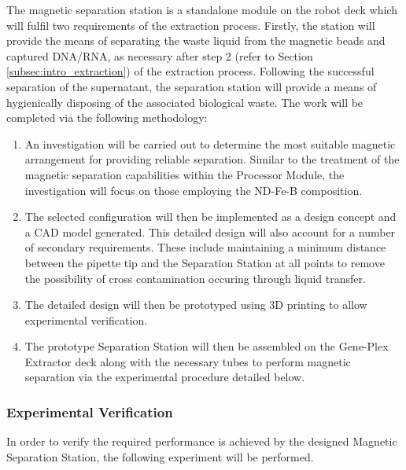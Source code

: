 The magnetic separation station is a standalone module on the robot deck which will fulfil two requirements of the extraction process. Firstly, the station will provide the means of separating the waste liquid from the magnetic beads and captured DNA/RNA, as necessary after step 2 (refer to Section \ref{subsec:intro_extraction}) of the extraction process. Following the successful separation of the supernatant, the separation station will provide a means of hygienically disposing of the associated biological waste. The work will be completed via the following methodology:

\begin{enumerate}
	\item An investigation will be carried out to determine the most suitable magnetic arrangement for providing reliable separation. Similar to the treatment of the magnetic separation capabilities within the Processor Module, the investigation will focus on those employing the ND-Fe-B composition.
	\item The selected configuration will then be implemented as a design concept and a CAD model generated. This detailed design will also account for a number of secondary requirements. These include maintaining a minimum distance between the pipette tip and the Separation Station at all points to remove the possibility of cross contamination occuring through liquid transfer.
	\item The detailed design will then be prototyped using 3D printing to allow experimental verification.
	\item The prototype Separation Station will then be assembled on the Gene-Plex Extractor deck along with the necessary tubes to perform magnetic separation via the experimental procedure detailed below.
\end{enumerate}

\subsubsection{Experimental Verification}

In order to verify the required performance is achieved by the designed Magnetic Separation Station, the following experiment will be performed.

